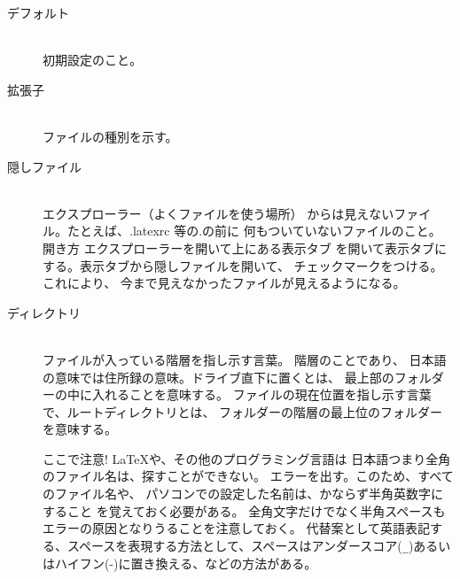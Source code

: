\documentclass[titlepage]{ltjsarticle}
\begin{document}
\begin{description}
  \item [デフォルト] ~\\
        初期設定のこと。
  \item[拡張子] ~\\
    ファイルの種別を示す。
  \item [隠しファイル] ~\\
        エクスプローラー（よくファイルを使う場所）
        からは見えないファイル。たとえば、.latexrc 等の.の前に
        何もついていないファイルのこと。
        開き方 エクスプローラーを開いて上にある表示タブ
        を開いて表示タブにする。表示タブから隠しファイルを開いて、
        チェックマークをつける。これにより、
        今まで見えなかったファイルが見えるようになる。

  \item [ディレクトリ] ~\\
        ファイルが入っている階層を指し示す言葉。
        階層のことであり、
        日本語の意味では住所録の意味。ドライブ直下に置くとは、
        最上部のフォルダーの中に入れることを意味する。
        ファイルの現在位置を指し示す言葉で、ルートディレクトリとは、
        フォルダーの階層の最上位のフォルダーを意味する。


        ここで注意! \LaTeX や、その他のプログラミング言語は
        日本語つまり全角のファイル名は、探すことができない。
        エラーを出す。このため、すべてのファイル名や、
        パソコンでの設定した名前は、かならず半角英数字にすること
        を覚えておく必要がある。
        全角文字だけでなく半角スペースもエラーの原因となりうることを注意しておく。
        代替案として英語表記する、スペースを表現する方法として、スペースはアンダースコア(\verb|_|)あるいはハイフン(-)に置き換える、などの方法がある。


\end{description}
\end{document}
